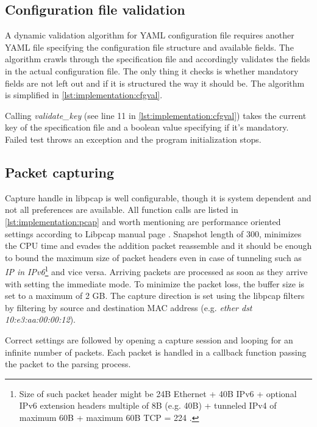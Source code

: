 \documentclass[12pt,a4paper,twoside]{book}
\begin{document}
        \subsection{Configuration file validation} \label{implementation:sensor:cfgval}
            A dynamic validation algorithm for YAML configuration file requires another YAML file specifying the configuration file structure and available fields. The algorithm crawls through the specification file and accordingly validates the fields in the actual configuration file. The only thing it checks is whether mandatory fields are not left out and if it is structured the way it should be. The algorithm is simplified in \autoref{lst:implementation:cfgval}.
            
            Calling \emph{validate\_key} (see line 11 in \autoref{lst:implementation:cfgval}) takes the current key of the specification file and a boolean value specifying if it's mandatory. Failed test throws an exception and the program initialization stops. 
        \subsection{Packet capturing} \label{implementation:sensor:cap}
            Capture handle in libpcap is well configurable, though it is system dependent and not all preferences are available. All function calls are listed in \autoref{lst:implementation:pcap} and worth mentioning are performance oriented settings according to Libpcap manual page \cite{man:pcap}. Snapshot length of 300, minimizes the CPU time and evades the addition packet reassemble and it should be enough to bound the maximum size of packet headers even in case of tunneling such as \emph{IP in IPv6}\footnote{Size of such packet header might be 24B Ethernet + 40B IPv6 + optional IPv6 extension headers multiple of 8B (e.g. 40B) + tunneled IPv4 of maximum 60B + maximum 60B TCP = 224 \cite{man:ipv6}.} and vice versa. Arriving packets are processed as soon as they arrive with setting the immediate mode. To minimize the packet loss, the buffer size is set to a maximum of 2 GB. The capture direction is set using the libpcap filters by filtering by source and destination MAC address (e.g. \emph{ether dst 10:e3:aa:00:00:12}).
            \par
            Correct settings are followed by opening a capture session and looping for an infinite number of packets. Each packet is handled in a callback function passing the packet to the parsing process.
\end{document}
